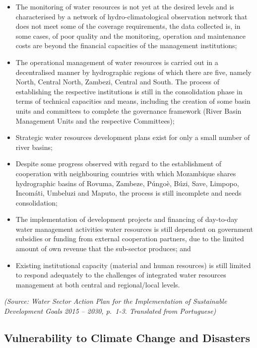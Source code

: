 \documentclass[
]{book}
\begin{document}
\begin{itemize}
\item
  The monitoring of water resources is not yet at the desired levels and is characterised by a network of hydro-climatological observation network that does not meet some of the coverage requirements, the data collected is, in some cases, of poor quality and the monitoring, operation and maintenance costs are beyond the financial capacities of the management institutions;
\item
  The operational management of water resources is carried out in a decentralised manner by hydrographic regions of which there are five, namely North, Central North, Zambezi, Central and South. The process of establishing the respective institutions is still in the consolidation phase in terms of technical capacities and means, including the creation of some basin units and committees to complete the governance framework (River Basin Management Units and the respective Committees);
\item
  Strategic water resources development plans exist for only a small number of river basins;
\item
  Despite some progress observed with regard to the establishment of cooperation with neighbouring countries with which Mozambique shares hydrographic basins of Rovuma, Zambeze, Púngoè, Búzi, Save, Limpopo, Incomáti, Umbeluzi and Maputo, the process is still incomplete and needs consolidation;
\item
  The implementation of development projects and financing of day-to-day water management activities water resources is still dependent on government subsidies or funding from external cooperation partners, due to the limited amount of own revenue that the sub-sector produces; and
\item
  Existing institutional capacity (material and human resources) is still limited to respond adequately to the challenges of integrated water resources management at both central and regional/local levels.
\end{itemize}

\emph{(Source: Water Sector Action Plan for the Implementation of Sustainable Development Goals 2015 -- 2030, p.~1-3. Translated from Portuguese)}

\hypertarget{vulnerability-to-climate-change-and-disasters-3}{%
\subsection{Vulnerability to Climate Change and Disasters}\label{vulnerability-to-climate-change-and-disasters-3}}
\end{document}
